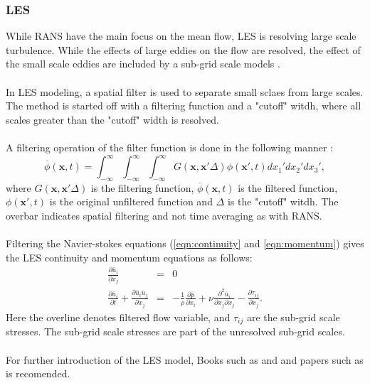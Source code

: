 \documentclass[a4paper, 12pt]{report}
\begin{document}
\subsubsection{LES}
While RANS have the main focus on the mean flow, LES is resolving large scale turbulence. While the effects of large eddies on the flow are resolved, the effect of the small scale eddies are included by a sub-grid scale models \cite{CFD}. \\
\\
In LES modeling, a spatial filter is used to separate small sclaes from large scales. The method is started off with a filtering function and a "cutoff" witdh, where all scales greater than the "cutoff" width is resolved. \\
\\
A filtering operation of the filter function is done in the following manner \cite{CFD}:
\begin{equation}
\overline{\phi}(\mathbf{x}, t) = \int_{-\infty}^{\infty}\int_{-\infty}^{\infty}\int_{-\infty}^{\infty} G(\mathbf{x}, \mathbf{x'} \Delta)\phi(\mathbf{x'},t)dx_1'dx_2'dx_3',
\label{eqn:filteringOperation}
\end{equation}
where $G(\mathbf{x}, \mathbf{x'} \Delta)$ is the filtering function, $\overline{\phi}(\mathbf{x}, t)$ is the filtered function, $\phi(\mathbf{x'},t)$ is the original unfiltered function and $\Delta$ is the "cutoff" witdh. The overbar indicates spatial filtering and not time averaging as with RANS.\\
\\
Filtering the Navier-stokes equations (\ref{eqn:continuity} and \ref{eqn:momentum}) gives the LES continuity and momentum equations as follows:
\begin{eqnarray}
\label{eqn:LEScontinuity}
\frac{\partial \overline{u}_i}{\partial x_j} &=&0\\
\label{eqn:LESmomentum}
\frac{\partial \overline{u}_i}{\partial t} +  \frac{\partial \overline{u}_i \overline{u}_j}{\partial x_j} &=& -\frac{1}{\rho} \frac{\partial \overline{p}}{\partial x_i} + \nu \frac{\partial ^2 \overline{u}_i}{\partial x_j \partial x_j} - \frac{\partial \tau_{ij}}{\partial x_j}.
\end{eqnarray}
Here the overline denotes filtered flow variable, and $\tau_{ij}$ are the sub-grid scale stresses. The sub-grid scale stresses are part of the unresolved sub-grid scales. \\
\\
For further introduction of the LES model, Books such as \cite{CFD} and \cite{LESTurbulence} and papers such as \cite{AppliedMathematicalModelling} is recomended. 
\end{document}
